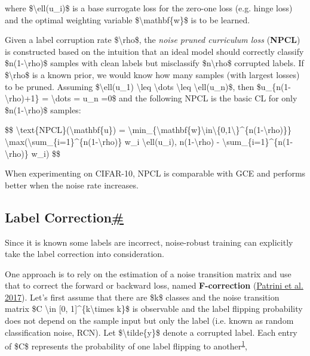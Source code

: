 where \$\textbackslash ell(u\_i)\$ is a base surrogate loss for the zero-one loss (e.g. hinge loss) and the optimal weighting variable \$\textbackslash mathbf\{w\}\$ is to be learned.

Given a label corruption rate \$\textbackslash rho\$, the \emph{noise pruned curriculum loss} (\textbf{NPCL}) is constructed based on the intuition that an ideal model should correctly classify \$n(1-\textbackslash rho)\$ samples with clean labels but misclassify \$n\textbackslash rho\$ corrupted labels. If \$\textbackslash rho\$ is a known prior, we would know how many samples (with largest losses) to be pruned. Assuming \$\textbackslash ell(u\_1) \textbackslash leq \textbackslash dots \textbackslash leq \textbackslash ell(u\_n)\$, then \$u\_\{n(1-\textbackslash rho)+1\} = \textbackslash dots = u\_n =0\$ and the following NPCL is the basic CL for only \$n(1-\textbackslash rho)\$ samples:

\$\$ \textbackslash text\{NPCL\}(\textbackslash mathbf\{u\}) = \textbackslash min\_\{\textbackslash mathbf\{w\}\textbackslash in\textbackslash\{0,1\textbackslash\}\^{}\{n(1-\textbackslash rho)\}\} \textbackslash max(\textbackslash sum\_\{i=1\}\^{}\{n(1-\textbackslash rho)\} w\_i \textbackslash ell(u\_i), n(1-\textbackslash rho) - \textbackslash sum\_\{i=1\}\^{}\{n(1-\textbackslash rho)\} w\_i) \$\$

When experimenting on CIFAR-10, NPCL is comparable with GCE and performs better when the noise rate increases.

\subsection{\texorpdfstring{Label Correction\hyperref[label-correction]{\#}}{Label Correction\#}}\label{label-correction}

Since it is known some labels are incorrect, noise-robust training can explicitly take the label correction into consideration.

\label{fcorrection}{}One approach is to rely on the estimation of a noise transition matrix and use that to correct the forward or backward loss, named \textbf{F-correction} (\href{https://arxiv.org/abs/1609.03683}{Patrini et al. 2017}). Let's first assume that there are \$k\$ classes and the noise transition matrix \$C \textbackslash in {[}0, 1{]}\^{}\{k\textbackslash times k\}\$ is observable and the label flipping probability does not depend on the sample input but only the label (i.e. known as random classification noise, RCN). Let \$\textbackslash tilde\{y\}\$ denote a corrupted label. Each entry of \$C\$ represents the probability of one label flipping to another\textsuperscript{\hyperref[fn:1]{1}},

